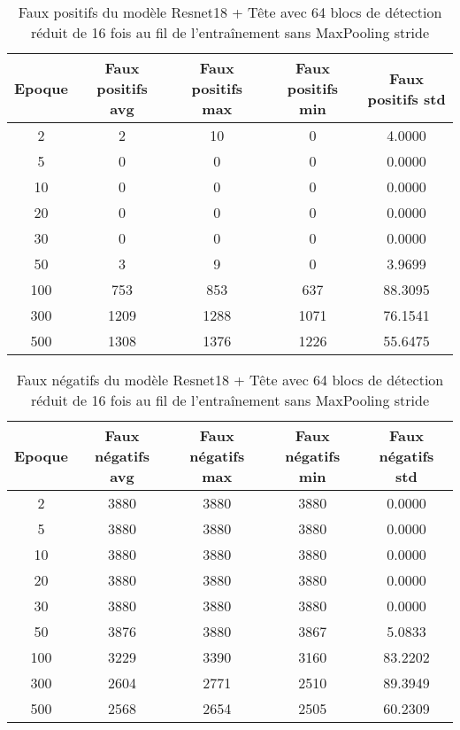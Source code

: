 \begin{table}[!ht]
    \caption{Faux positifs du modèle Resnet18 + Tête avec 64 blocs de détection réduit de 16 fois au fil de l'entraînement sans MaxPooling stride}
    \label{tab:resnet18+head_64n_reduced_16x_false_positive_wo_maxpool_stride}
    \centering
    \begin{tabular}{ |c||c|c|c|c|  }
        \hline
        \rowcolor{gray!50}
        Epoque & Faux positifs avg & Faux positifs max & Faux positifs min & Faux positifs std\\
        \hline
        2 & 2 & 10 & 0 & 4.0000\\
        5 & 0 & 0 & 0 & 0.0000\\
        10 & 0 & 0 & 0 & 0.0000\\
        20 & 0 & 0 & 0 & 0.0000\\
        30 & 0 & 0 & 0 & 0.0000\\
        50 & 3 & 9 & 0 & 3.9699\\
        100 & 753 & 853 & 637 & 88.3095\\
        300 & 1209 & 1288 & 1071 & 76.1541\\
        500 & 1308 & 1376 & 1226 & 55.6475\\
        \hline
    \end{tabular}
\end{table}

\begin{table}[!ht]
    \caption{Faux négatifs du modèle Resnet18 + Tête avec 64 blocs de détection réduit de 16 fois au fil de l'entraînement sans MaxPooling stride}
    \label{tab:resnet18+head_64n_reduced_16x_false_negative_wo_maxpool_stride}
    \centering
    \begin{tabular}{ |c||c|c|c|c|  }
        \hline
        \rowcolor{gray!50}
        Epoque & Faux négatifs avg & Faux négatifs max & Faux négatifs min & Faux négatifs std\\
        \hline
        2 & 3880 & 3880 & 3880 & 0.0000\\
        5 & 3880 & 3880 & 3880 & 0.0000\\
        10 & 3880 & 3880 & 3880 & 0.0000\\
        20 & 3880 & 3880 & 3880 & 0.0000\\
        30 & 3880 & 3880 & 3880 & 0.0000\\
        50 & 3876 & 3880 & 3867 & 5.0833\\
        100 & 3229 & 3390 & 3160 & 83.2202\\
        300 & 2604 & 2771 & 2510 & 89.3949\\
        500 & 2568 & 2654 & 2505 & 60.2309\\
        \hline
    \end{tabular}
\end{table}

